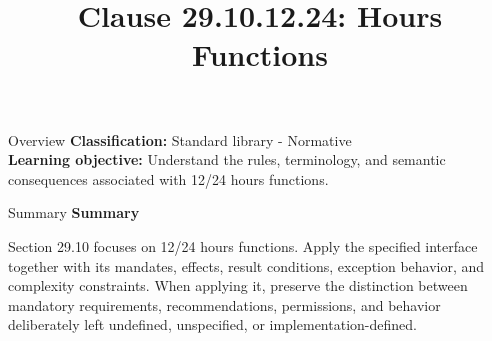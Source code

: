 \documentclass[10pt,letterpaper]{article}
\title{Clause 29.10.12.24: Hours Functions}
\author{}
\date{}
\begin{document}
\maketitle
\begin{CornellOverviewBox}{Overview}
\textbf{Classification:} Standard library - Normative\\[2pt]
\textbf{Learning objective:} Understand the rules, terminology, and semantic consequences associated with 12/24 hours functions.
\end{CornellOverviewBox}\begin{CornellSummaryBox}{Summary}
{\sffamily\bfseries\color{Accent} Summary}\par\vspace{3pt}Section 29.10 focuses on 12/24 hours functions. Apply the specified interface together with its mandates, effects, result conditions, exception behavior, and complexity constraints. When applying it, preserve the distinction between mandatory requirements, recommendations, permissions, and behavior deliberately left undefined, unspecified, or implementation-defined.
\end{CornellSummaryBox}
\end{document}
